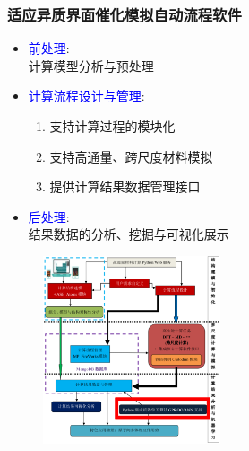 \begin{frame}
	\frametitle{适应异质界面催化模拟自动流程软件}
\begin{minipage}[c]{0.42\linewidth}
\begin{itemize}
\vspace*{-2.75in}
	\item \textcolor{blue}{前处理}:\\
		计算模型分析与预处理
	\item \textcolor{blue}{计算流程设计与管理}:\\
		\begin{enumerate}
			\item 支持计算过程的模块化
			\item 支持高通量、跨尺度材料模拟
			\item 提供计算结果数据管理接口
		\end{enumerate}
	\item \textcolor{blue}{后处理}:\\
		结果数据的分析、挖掘与可视化展示
\end{itemize}
\end{minipage}
\hskip 2pt
\begin{minipage}[b]{0.47\linewidth}
\begin{figure}[h!]
\centering
\includegraphics[height=2.18in]{Figures/MP_comp_BCC.png}

\end{figure}
\end{minipage}
\end{frame}
